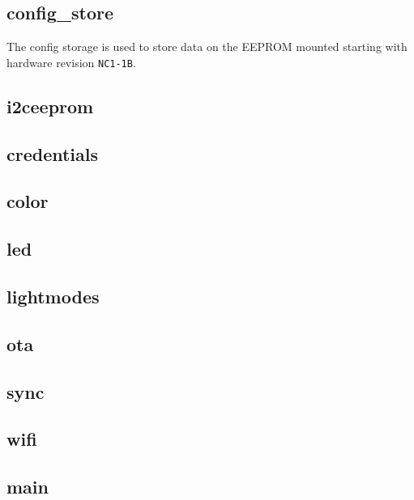 \subsection{config\_store}
The config storage is used to store data on the EEPROM mounted starting with hardware revision \texttt{NC1-1B}. 


\subsection{i2ceeprom}

\subsection{credentials}

\subsection{color}

\subsection{led}

\subsection{lightmodes}

\subsection{ota}

\subsection{sync}

\subsection{wifi}

\subsection{main}